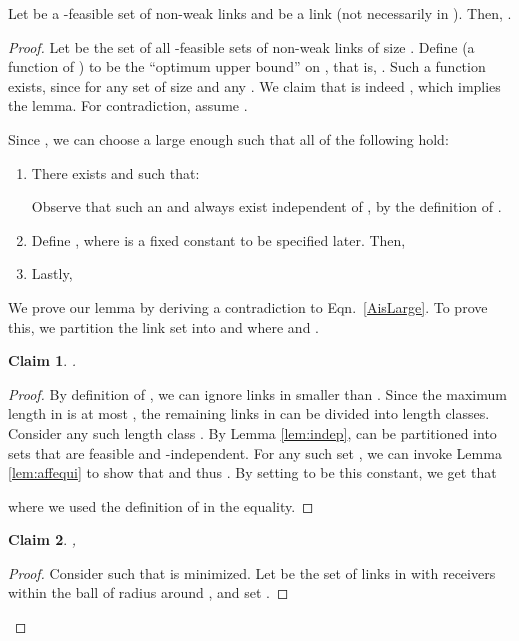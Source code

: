 \documentclass[11pt]{amsart}
\newtheorem{claim}{Claim}
\begin{document}
\begin{lemma}
Let  be a -feasible set of non-weak links and  be a link (not necessarily in ). 
Then, .
\label{lem:constoutaff}
\end{lemma}
\begin{proof}
Let  be the set of all -feasible sets of non-weak links of size .
Define  (a function of ) to be the ``optimum upper bound'' on , that is, . Such a function exists, since  for any set  of size  and any . 
We claim that  is indeed , which implies the lemma. 
For contradiction, assume . 

Since , we can choose a large enough  such that all of the following hold:
\begin{enumerate}
\renewcommand{\labelenumi}{(\alph{enumi})}

\item There exists  and  such that:


Observe that such an  and  always exist independent of , by the definition of .

\item Define , 
where  is a fixed constant to be specified later.
Then,


\item Lastly,

\end{enumerate}



We prove our lemma by deriving a contradiction to Eqn.\ \ref{AisLarge}. 
To prove this, 
we partition the link set  into  and  where  and  .

\begin{claim}
\label{affonl1}
. 
\end{claim}
\begin{proof}
By definition of , we can ignore links in  smaller than . Since the maximum length in  is at most , the remaining links in
  can be divided into  length classes. 
 Consider any such length class .
By Lemma \ref{lem:indep},  can be partitioned into  sets that are feasible and -independent. For any such set , we 
can invoke Lemma \ref{lem:affequi} to show that  and thus 
. By setting  to be this constant, we get that

where we used the definition of  in the equality.
\end{proof}

\begin{claim}
,
\label{affonl2}
\end{claim}
\begin{proof}
Consider  such that  is
minimized.
Let  be the set of links in  with 
receivers within the ball  of radius  around , 
and set .



\end{proof}
\end{proof}
\end{document}
